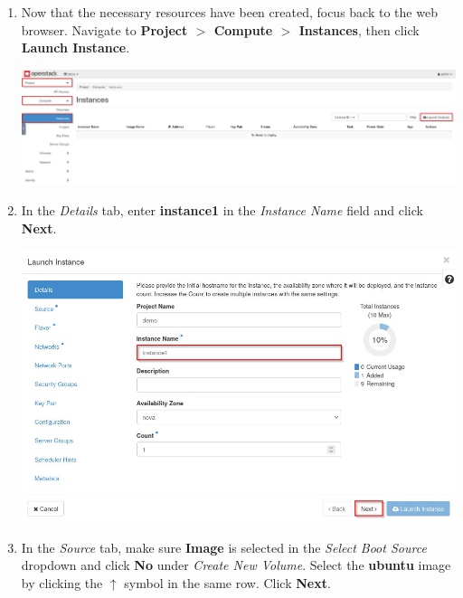 \documentclass[letterpaper, 12pt]{article}
\begin{document}
\begin{enumerate}
    \item Now that the necessary resources have been created, focus back to the web browser. Navigate to
    \textbf{Project $>$ Compute $>$ Instances}, then click \textbf{Launch Instance}.

    \begin{center}
        \includegraphics[width=\linewidth]{images/part1/step18.png}
    \end{center}

    \item In the \textit{Details} tab, enter \textbf{instance1} in the \textit{Instance Name} field and click
    \textbf{Next}.

    \begin{center}
        \includegraphics[width=\linewidth]{images/part1/step19.png}
    \end{center}

    \item In the \textit{Source} tab, make sure \textbf{Image} is selected in the \textit{Select Boot Source} dropdown
    and click \textbf{No} under \textit{Create New Volume}. Select the \textbf{ubuntu} image by clicking the $\uparrow$
    symbol in the same row. Click \textbf{Next}.


\end{enumerate}
\end{document}
